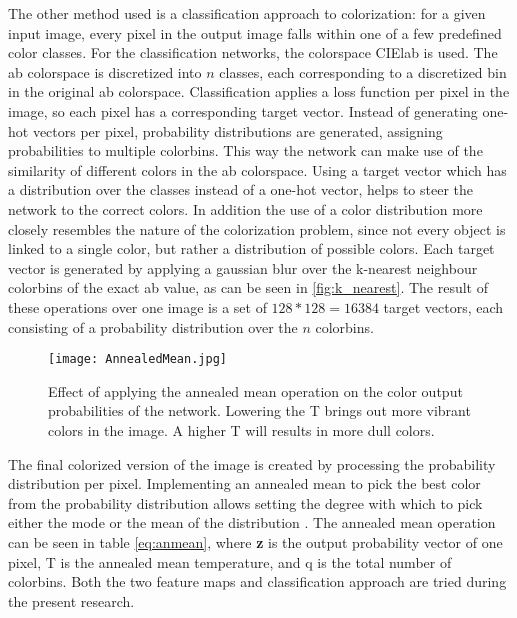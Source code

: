 The other method used is a classification approach to colorization: for a given input image, every pixel in the output image falls within one of a few predefined color classes. For the classification networks, the colorspace CIElab is used. The ab colorspace is discretized into $n$ classes, each corresponding to a discretized bin in the original ab colorspace. Classification applies a loss function per pixel in the image, so each pixel has a corresponding target vector. Instead of generating one-hot vectors per pixel, probability distributions are generated, assigning probabilities to multiple colorbins. This way the network can make use of the similarity of different colors in the ab colorspace. Using a target vector which has a distribution over the classes instead of a one-hot vector, helps to steer the network to the correct colors. In addition the use of a color distribution more closely resembles the nature of the colorization problem, since not every object is linked to a single color, but rather a distribution of possible colors. 
Each target vector is generated by applying a gaussian blur over the k-nearest neighbour colorbins of the exact ab value, as can be seen in \ref{fig:k_nearest}. The result of these operations over one image is a set of $128*128=16384$ target vectors, each consisting of a probability distribution over the $n$ colorbins. 

\begin{figure}[h]
	\centering
	\texttt{[image: AnnealedMean.jpg]}
	\centering
	\caption{Effect of applying the annealed mean operation on the  color output probabilities of the network. Lowering the T brings out more vibrant colors in the image. A higher T will results in more dull colors.}
	\label{fig:anmean}
\end{figure}

The final colorized version of the image is created by processing the probability distribution per pixel. Implementing an annealed mean to pick the best color from the probability distribution allows setting the degree with which to pick either the mode or the mean of the distribution \cite{Zhang}. The annealed mean operation can be seen in table \ref{eq:anmean}, where \textbf{z} is the output probability vector of one pixel, T is the annealed mean temperature, and q is the total number of colorbins. Both the two feature maps and classification approach are tried during the present research.\\




